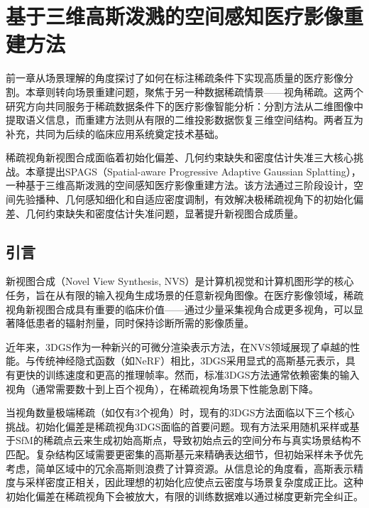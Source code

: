
\chapter{基于三维高斯泼溅的空间感知医疗影像重建方法}
\label{chapter:4}

前一章从场景理解的角度探讨了如何在标注稀疏条件下实现高质量的医疗影像分割。本章则转向场景重建问题，聚焦于另一种数据稀疏情景——视角稀疏。这两个研究方向共同服务于稀疏数据条件下的医疗影像智能分析：分割方法从二维图像中提取语义信息，而重建方法则从有限的二维投影数据恢复三维空间结构。两者互为补充，共同为后续的临床应用系统奠定技术基础。

稀疏视角新视图合成面临着初始化偏差、几何约束缺失和密度估计失准三大核心挑战。本章提出SPAGS（Spatial-aware Progressive Adaptive Gaussian Splatting），一种基于三维高斯泼溅的空间感知医疗影像重建方法。该方法通过三阶段设计，空间先验播种、几何感知细化和自适应密度调制，有效解决极稀疏视角下的初始化偏差、几何约束缺失和密度估计失准问题，显著提升新视图合成质量。

\section{引言}

新视图合成（Novel View Synthesis, NVS）是计算机视觉和计算机图形学的核心任务，旨在从有限的输入视角生成场景的任意新视角图像\cite{hartley2003multiple}。在医疗影像领域，稀疏视角新视图合成具有重要的临床价值——通过少量采集视角合成更多视角，可以显著降低患者的辐射剂量\cite{brenner2007radiation,mccollough2009lowdose}，同时保持诊断所需的影像质量。

近年来，3DGS\cite{3DGS}作为一种新兴的可微分渲染表示方法，在NVS领域展现了卓越的性能。与传统神经隐式函数（如NeRF\cite{nerf,mipnerf,mip360}）相比，3DGS采用显式的高斯基元表示，具有更快的训练速度和更高的推理帧率。然而，标准3DGS方法通常依赖密集的输入视角（通常需要数十到上百个视角），在稀疏视角场景下性能急剧下降\cite{niemeyer2022regnerf,yang2023freenerf}。

当视角数量极端稀疏（如仅有3个视角）时，现有的3DGS方法面临以下三个核心挑战。初始化偏差是稀疏视角3DGS面临的首要问题。现有方法采用随机采样或基于SfM的稀疏点云来生成初始高斯点\cite{colmap1,colmap2}，导致初始点云的空间分布与真实场景结构不匹配。复杂结构区域需要更密集的高斯基元来精确表达细节，但初始采样未予优先考虑，简单区域中的冗余高斯则浪费了计算资源。从信息论的角度看，高斯表示精度与采样密度正相关，因此理想的初始化应使点云密度与场景复杂度成正比\cite{raings}。这种初始化偏差在稀疏视角下会被放大，有限的训练数据难以通过梯度更新完全纠正。

